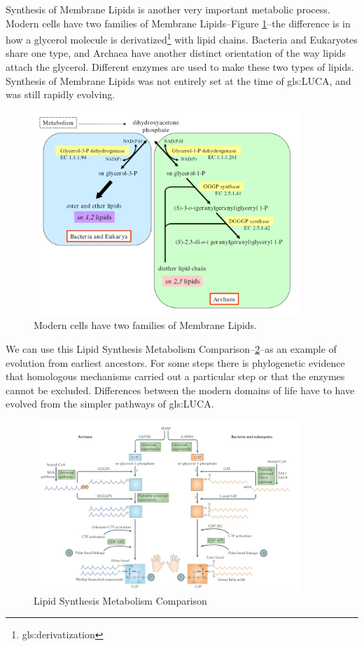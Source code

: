 \documentclass[]{article}
\begin{document}
Synthesis of Membrane Lipids is another very important metabolic process. Modern cells have two families of Membrane Lipids--Figure \ref{fig:SynthsisMembraneLipids}--the difference is in how a glycerol molecule is derivatized\footnote{\glsdesc{gls:derivatization}} with lipid chains. Bacteria and Eukaryotes share one type, and Archaea have another distinct orientation of the way lipids attach the glycerol. Different enzymes are used to make these two types of lipids. Synthesis of Membrane Lipids was not entirely set at the time of \gls{gls:LUCA}, and was still rapidly evolving. 

\begin{figure}[H]
	\caption[Modern cells have two families of Membrane Lipids]{Modern cells have two families of Membrane Lipids\cite{glansdorff2008last}.} \label{fig:SynthsisMembraneLipids} 
	\includegraphics[width=0.9\textwidth]{SynthsisMembraneLipids}
\end{figure}

We can use this Lipid Synthesis Metabolism Comparison--\ref {fig:LipidSynthesisComparison}--as an example of evolution from earliest ancestors. For some steps there is phylogenetic evidence that homologous mechanisms carried out a particular step or that the enzymes cannot be excluded. Differences between the modern domains of life have to have evolved from the simpler pathways of \gls{gls:LUCA}.
\begin{figure}[H]
	\caption[Lipid Synthesis Metabolism Comparison]{Lipid Synthesis Metabolism Comparison\cite{lombard2012early}} \label{fig:LipidSynthesisComparison} 
	\includegraphics[width=0.9\textwidth]{LipidSynthesisComparison}
\end{figure}
\end{document}
